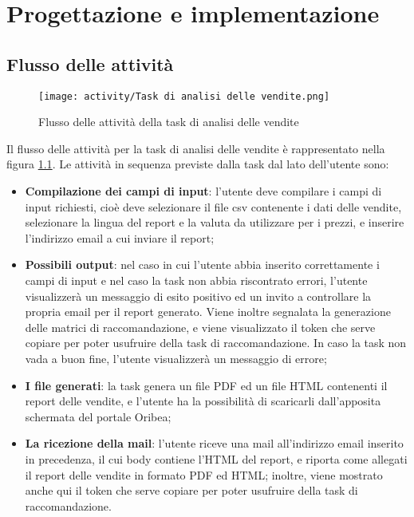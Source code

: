 \chapter{Progettazione e implementazione}
\label{cap:progettazione-implementazione}


\section{Flusso delle attività}

\begin{figure}[!h]
    \centering 
    \texttt{[image: activity/Task di analisi delle vendite.png]}
    \caption{Flusso delle attività della task di analisi delle vendite}
    \label{fig:activity-sales-analysis}
\end{figure}

Il flusso delle attività per la task di analisi delle vendite è rappresentato nella figura \ref{fig:activity-sales-analysis}. Le attività in sequenza previste dalla task dal lato dell'utente sono:
\begin{itemize}
    \item \textbf{Compilazione dei campi di input}: l'utente deve compilare i campi di input richiesti, cioè deve selezionare il file \gls{csv} contenente i dati delle vendite, selezionare la lingua del report e la valuta da utilizzare per i prezzi, e inserire l'indirizzo email a cui inviare il report;
    \item \textbf{Possibili output}: nel caso in cui l'utente abbia inserito correttamente i campi di input e nel caso la task non abbia riscontrato errori, l'utente visualizzerà un messaggio di esito positivo ed un invito a controllare la propria email per il report generato. Viene inoltre segnalata la generazione delle matrici di raccomandazione, e viene visualizzato il token che serve copiare per poter usufruire della task di raccomandazione. In caso la task non vada a buon fine, l'utente visualizzerà un messaggio di errore;
    \item \textbf{I file generati}: la task genera un file PDF ed un file HTML contenenti il report delle vendite, e l'utente ha la possibilità di scaricarli dall'apposita schermata del portale Oribea;
    \item \textbf{La ricezione della mail}: l'utente riceve una mail all'indirizzo email inserito in precedenza, il cui body contiene l'HTML del report, e riporta come allegati il report delle vendite in formato PDF ed HTML; inoltre, viene mostrato anche qui il token che serve copiare per poter usufruire della task di raccomandazione.
\end{itemize}

